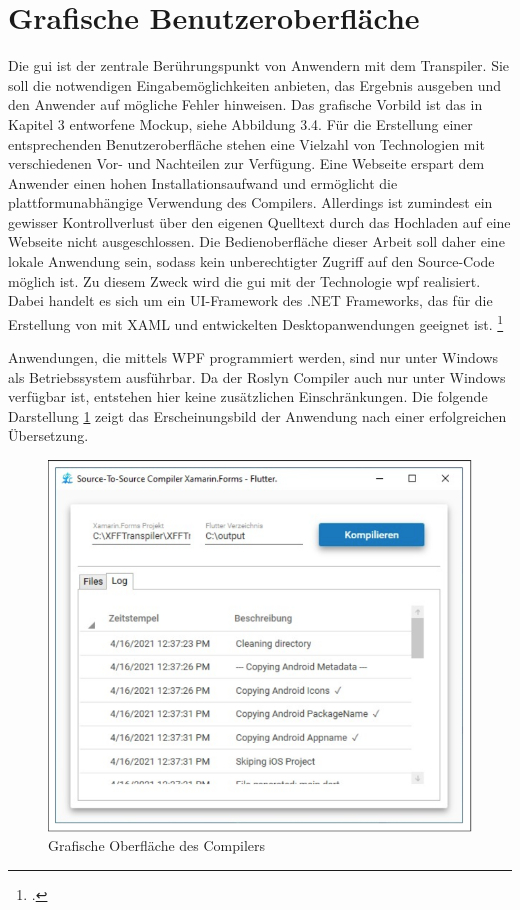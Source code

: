  


\section{Grafische Benutzeroberfläche}
Die \ac{gui} ist der zentrale Berührungspunkt von Anwendern mit dem Transpiler.  Sie soll die notwendigen Eingabemöglichkeiten anbieten, das Ergebnis ausgeben und den Anwender auf mögliche Fehler hinweisen.  Das grafische Vorbild ist das in Kapitel 3 entworfene Mockup, siehe Abbildung 3.4.  Für die Erstellung einer entsprechenden Benutzeroberfläche stehen eine Vielzahl von Technologien mit verschiedenen Vor- und Nachteilen zur Verfügung.  Eine Webseite erspart dem Anwender einen hohen Installationsaufwand und ermöglicht die plattformunabhängige Verwendung des Compilers.  Allerdings ist zumindest ein gewisser Kontrollverlust über den eigenen Quelltext durch das  Hochladen auf eine Webseite nicht ausgeschlossen.  Die Bedienoberfläche dieser Arbeit soll daher eine lokale Anwendung sein, sodass kein  unberechtigter Zugriff auf den Source-Code möglich ist.  Zu diesem Zweck wird die \ac{gui}  mit der Technologie \ac{wpf} realisiert.  Dabei handelt es sich um ein UI-Framework des .NET Frameworks, das für die Erstellung von mit XAML und \Csharp{} entwickelten Desktopanwendungen geeignet ist. \footcite[Vgl.][S. 1f]{Wenger2012} 

Anwendungen,  die mittels WPF programmiert werden, sind nur unter Windows als Betriebssystem ausführbar.  Da der Roslyn Compiler auch nur unter Windows verfügbar ist,  entstehen hier keine zusätzlichen Einschränkungen.  Die folgende Darstellung \ref{fig:CompilerUI} zeigt das Erscheinungsbild der Anwendung nach einer erfolgreichen Übersetzung.
\newpage
\begin{figure}[!ht]
 \includegraphics[width=\textwidth,keepaspectratio]{Images/Implementation/UiScreenshot.png}
 \caption{Grafische Oberfläche des Compilers}
 \label{fig:CompilerUI}
\end{figure}

